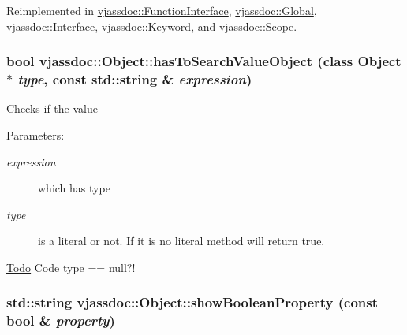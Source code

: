 Reimplemented in \hyperlink{classvjassdoc_1_1FunctionInterface_c9519495c94b07101fa5e0739775759e}{vjassdoc::FunctionInterface}, \hyperlink{classvjassdoc_1_1Global_cbf7be8310f31bd7dc142b290020b4a9}{vjassdoc::Global}, \hyperlink{classvjassdoc_1_1Interface_69ae9cd3e06f91fc2c33ebd6f1b425fe}{vjassdoc::Interface}, \hyperlink{classvjassdoc_1_1Keyword_9496b5c2a1eedee46d27dd166608b12f}{vjassdoc::Keyword}, and \hyperlink{classvjassdoc_1_1Scope_4d9d486897a1960cff057ab88a43fb15}{vjassdoc::Scope}.\hypertarget{classvjassdoc_1_1Object_e9ed6f9d16334a979405a9f2efab2239}{
\subsubsection{\setlength{\rightskip}{0pt plus 5cm}bool vjassdoc::Object::hasToSearchValueObject (class {\bf Object} $\ast$ {\em type}, const std::string \& {\em expression})}}
\label{classvjassdoc_1_1Object_e9ed6f9d16334a979405a9f2efab2239}


Checks if the value \begin{Desc}
\item[Parameters:]
\begin{description}
\item[{\em expression}]which has type \item[{\em type}]is a literal or not. If it is no literal method will return true. \end{description}
\end{Desc}


\begin{Desc}
\item[\hyperlink{todo__todo000004}{Todo}]Code type == null?! \end{Desc}
\hypertarget{classvjassdoc_1_1Object_6715790d5be823157b8cf21d181b3450}{
\subsubsection{\setlength{\rightskip}{0pt plus 5cm}std::string vjassdoc::Object::showBooleanProperty (const bool \& {\em property})}}
\label{classvjassdoc_1_1Object_6715790d5be823157b8cf21d181b3450}


